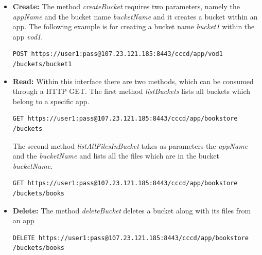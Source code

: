 \begin{itemize}
\item \textbf{Create:} The method \textit{createBucket} requires two parameters, namely the \textit{appName} and the bucket name \textit{bucketName} and it creates a bucket within an app. The following example is for creating a bucket name \textit{bucket1} within the app \textit{vod1}.

\begin{code}
\begin{verbatim}
POST https://user1:pass@107.23.121.185:8443/cccd/app/vod1
/buckets/bucket1
\end{verbatim}
\end{code}


\item \textbf{Read:} Within this interface there are two methods, which can be consumed through a \ac{HTTP} GET. The first method \textit{listBuckets} lists all buckets which belong to a specific app. 

\begin{code}
\begin{verbatim}
GET https://user1:pass@107.23.121.185:8443/cccd/app/bookstore
/buckets
\end{verbatim}
\end{code}

The second method \textit{listAllFilesInBucket} takes as parameters the \textit{appName} and the \textit{bucketName} and lists all the files which are in the bucket \textit{bucketName}.

\begin{code}
\begin{verbatim}
GET https://user1:pass@107.23.121.185:8443/cccd/app/bookstore
/buckets/books
\end{verbatim}
\end{code}


\item \textbf{Delete:} The method \textit{deleteBucket} deletes a bucket along with its files from an app 

\begin{code}
\begin{verbatim}
DELETE https://user1:pass@107.23.121.185:8443/cccd/app/bookstore
/buckets/books
\end{verbatim}
\end{code}

\end{itemize}

